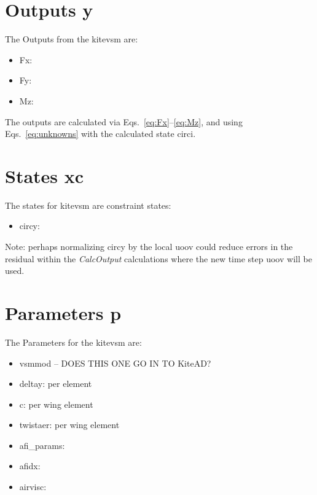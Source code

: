 \documentclass[report]{nrel}
\begin{document}
	\section{Outputs y}\label{sec:outputs}
	The Outputs from the \gls{kitevsm} are:
	\begin{itemize}
		\item \gls{Fx}: 
    	\item \gls{Fy}: 
		\item \gls{Mz}: 

						
	\end{itemize}
	The outputs are calculated via Eqs.~\eqref{eq:Fx}--\eqref{eq:Mz}, and using Eqs.~\eqref{eq:unknowns} with the calculated state \gls{circi}.
	\section{States \gls{xc}}\label{sec:states}
	The states for \gls{kitevsm} are constraint states:\newline
	\begin{itemize}
		\item \gls{circy}: 
	\end{itemize}

	Note: perhaps normalizing \gls{circy} by the local \gls{uoov} could reduce errors in the residual within the \emph{CalcOutput} calculations where the new time step \gls{uoov} will be used.
	\section{Parameters p}\label{sec:parameters}
	The Parameters for the \gls{kitevsm} are:
	\begin{itemize}
				\item \gls{vsmmod} -- 
		DOES THIS ONE GO IN TO KiteAD?
		
		\item \gls{deltay}:  per element
		\item \gls{c}:  per wing element
		
	
		\item \gls{twistaer}: per wing element
		
		\item \gls{afi_params}: 
		\item \gls{afidx}: 
		\item \gls{airvisc}: 
	\end{itemize}
				
\end{document}
